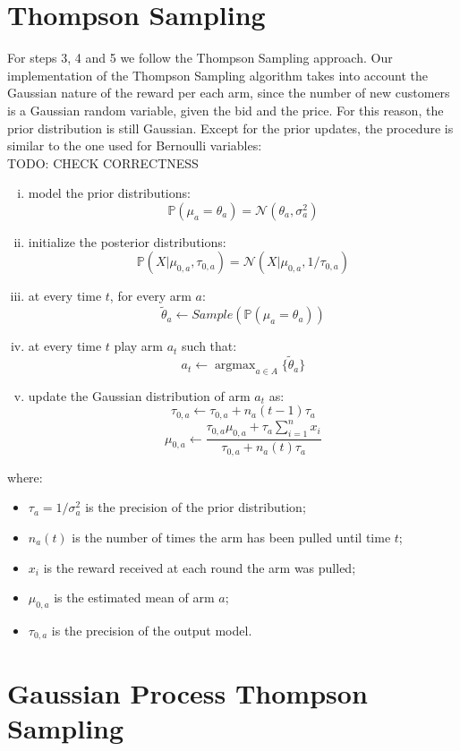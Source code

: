 \documentclass[12pt,a4paper]{report}
\DeclareMathOperator*{\argmax}{argmax}
\begin{document}
		\section{Thompson Sampling}
For steps 3, 4 and 5 we follow the Thompson Sampling approach.
Our implementation of the Thompson Sampling algorithm takes into account the Gaussian nature of the reward per each arm, since the number of new customers is a Gaussian random variable, given the bid and the price. For this reason, the prior distribution is still Gaussian. 
Except for the prior updates, the procedure is similar to the one used for Bernoulli variables:
\\TODO: CHECK CORRECTNESS
\begin{enumerate}[i)]
	\item model the prior distributions: $$\mathbb{P}(\mu_a = \theta_a) = \mathcal{N}(\theta_a, \sigma^2_a)$$
	\item initialize the posterior distributions: $$\mathbb{P}(X|\mu_{0,a}, \tau_{0,a}) = \mathcal{N}(X|\mu_{0,a}, 1/\tau_{0,a}) $$
	\item at every time $t$, for every arm $a$:
\[ \tilde \theta_a \leftarrow Sample\left(\mathbb{P}(\mu_a = \theta_a)\right)\]
	\item at every time $t$ play arm $a_t$ such that:
		$$a_t \leftarrow \argmax_{a \in A} \{\tilde \theta_a\} $$
	\item update the Gaussian distribution of arm $a_t$ as:
		$$\tau_{0,a} \leftarrow \tau_{0,a} + n_a(t-1)\tau_a $$
		$$\mu_{0,a} \leftarrow \frac{\tau_{0,a}\mu_{0,a} + \tau_a \sum_{i=1}^{n}{x_i}}{\tau_{0,a} + n_a(t)\tau_a} $$
\end{enumerate}
where:
\begin{itemize}
	\item $\tau_a = 1/\sigma^2_a$ is the precision of the prior distribution;
	\item $n_a(t)$ is the number of times the arm has been pulled until time $t$;
	\item $x_i$ is the reward received at each round the arm was pulled;
	\item $\mu_{0,a}$ is the estimated mean of arm $a$;
	\item $\tau_{0,a}$ is the precision of the output model.
\end{itemize}		

\section{Gaussian Process Thompson Sampling}
\end{document}
